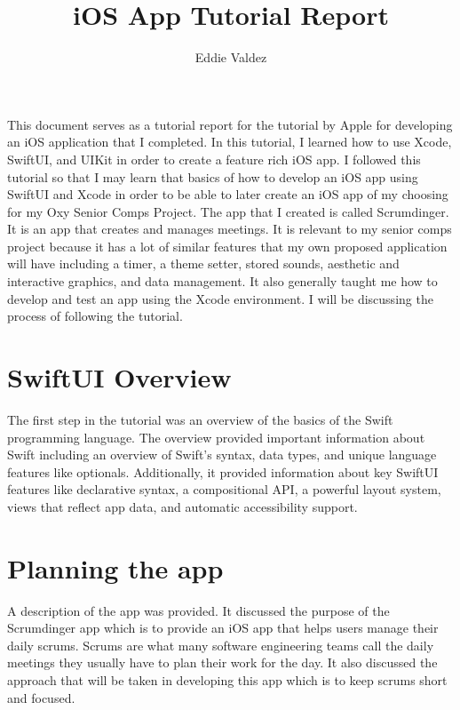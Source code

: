 \documentclass[10pt,twocolumn]{article}
\title{iOS App Tutorial Report}
\author{Eddie Valdez}
\affiliation{Occidental College}
\begin{document}
\maketitle

\begin{intro}
    This document serves as a tutorial report for the tutorial by Apple for developing an iOS application that I completed. In this tutorial, I learned how to use Xcode, SwiftUI, and UIKit in order to create a feature rich iOS app. I followed this tutorial so that I may learn that basics of how to develop an iOS app using SwiftUI and Xcode in order to be able to later create an iOS app of my choosing for my Oxy Senior Comps Project. The app that I created is called Scrumdinger. It is an app that creates and manages meetings. It is relevant to my senior comps project because it has a lot of similar features that my own proposed application will have including a timer, a theme setter, stored sounds, aesthetic and interactive graphics, and data management. It also generally taught me how to develop and test an app using the Xcode environment. I will be discussing the process of following the tutorial.
\end{intro}

\section{SwiftUI Overview}

The first step in the tutorial was an overview of the basics of the Swift programming language. The overview provided important information about Swift including an overview of Swift's syntax, data types, and unique language features like optionals. Additionally, it provided information about key SwiftUI features like declarative syntax, a compositional API, a powerful layout system, views that reflect app data, and automatic accessibility support. 

\section{Planning the app}

A description of the app was provided. It discussed the purpose of the Scrumdinger app which is to provide an iOS app that helps users manage their daily scrums. Scrums are what many software engineering teams call the daily meetings they usually have to plan their work for the day. It also discussed the approach that will be taken in developing this app which is to keep scrums short and focused. 
\end{document}
